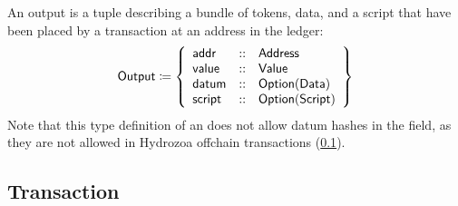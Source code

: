 \documentclass[../hydrozoa.tex]{subfiles}
\begin{document}
An output is a tuple describing a bundle of tokens, data, and a script that have been placed by a transaction at an address in the ledger:
\begin{equation*}
    \mathsf{Output} \coloneq \left\{
    \begin{array}{lll}
      \mathsf{addr} &::& \mathsf{Address} \\
        \mathsf{value} &::& \mathsf{Value} \\
        \mathsf{datum} &::& \mathsf{Option(Data)} \\
        \mathsf{script} &::& \mathsf{Option(Script)}
    \end{array} \right\}
\end{equation*}
Note that this type definition of an  does not allow datum hashes in the  field, as they are not allowed in Hydrozoa offchain transactions (\cref{h:ledger-transaction}).

\subsection{Transaction}%
\label{h:ledger-transaction}
\end{document}

